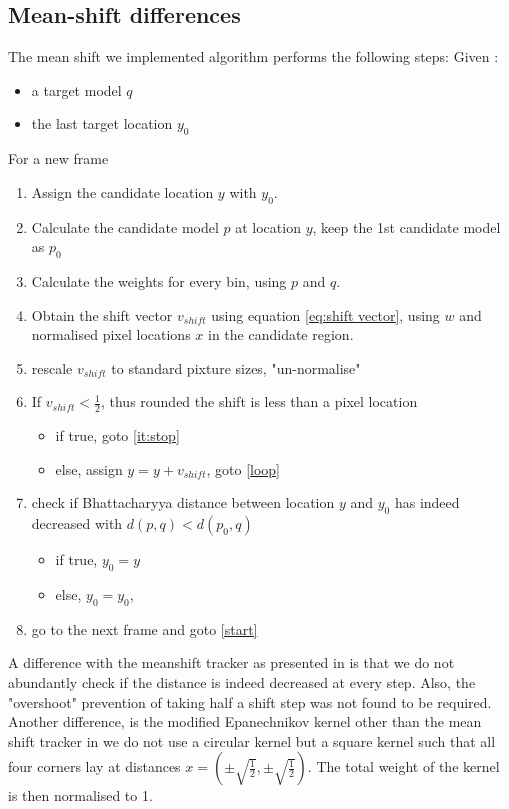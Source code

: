 \documentclass[a4paper,11pt]{article}
\begin{document}
\subsection{Mean-shift differences}
The mean shift we implemented algorithm performs the following steps:
Given : 
\begin{itemize}
\item a target model $q$
\item the last target location $y_0$
\end{itemize}
For a new frame
\begin{enumerate}
\item \label{start} Assign the candidate location $y$ with $y_0$.
\item \label{loop} Calculate the candidate model $p$ at location $y$, keep the 1st candidate model as $p_0$
\item Calculate the weights for every bin, using $p$ and $q$.
\item Obtain the shift vector $v_{shift}$ using equation \ref{eq:shift vector}, using $w$ and normalised pixel locations $x$ in the candidate region.
\item rescale $v_{shift}$ to standard pixture sizes, "un-normalise"
\item If $v_{shift} < \frac{1}{2}$, thus rounded the shift is less than a pixel location\\
\begin{itemize}
\item if true, goto \ref{it:stop}
\item else, assign $y=y+v_{shift}$, goto \ref{loop}
\end{itemize}
\item \label{it:stop} check if Bhattacharyya distance between location $y$ and $y_0$ has indeed decreased with $d(p,q) < d(p_0,q)$ 
\begin{itemize}
\item if true, $y_0 = y$
\item else, $y_0 = y_0$, 
\end{itemize}
\item go to the next frame and goto \ref{start}
\end{enumerate}

A difference with the meanshift tracker as presented in \cite{mean_shift} is that we do not  abundantly check if the distance is indeed decreased at every step. Also, the "overshoot" prevention of taking half a shift step was not found to be required. Another difference, is the modified  Epanechnikov kernel other than the mean shift tracker in \cite{mean_shift} we do not use a circular kernel but a square kernel such that all four corners lay at distances $x=(\pm \sqrt{\frac{1}{2}},\pm \sqrt{\frac{1}{2}})$. The total weight of the kernel is then normalised to 1.
  
\end{document}
